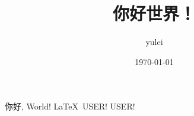 \documentclass{ctexart}
\title{你好世界！}
\author{yulei}
\date{\today}
\begin{document}
\maketitle
你好, World!
\LaTeX\ USER! USER!
\end{document}
